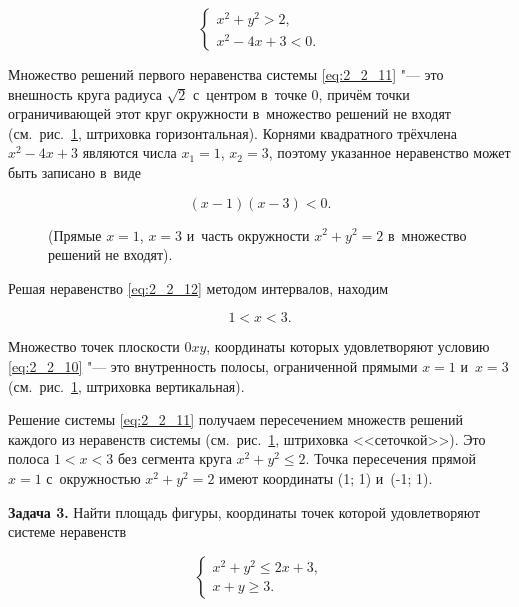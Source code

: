 \begin{equation}\label{eq:2_2_11}
\begin{cases}
x^{2} + y^{2} > 2, \\
x^{2} - 4x + 3 < 0.
\end{cases}
\end{equation}

Множество решений первого неравенства системы \eqref{eq:2_2_11}
"--- это внешность круга радиуса $\sqrt{2}$ с~центром в~точке 0,
причём точки ограничивающей этот круг окружности в~множество решений
не входят (см.\ рис.\ \ref{fig:2_2_4}, штриховка горизонтальная).
Корнями квадратного трёхчлена $x^{2} - 4x + 3$ являются числа
$x_{1} = 1$, $x_{2} = 3$, поэтому указанное неравенство
может быть записано в~виде

\begin{equation}\label{eq:2_2_12}
(x - 1)(x - 3) < 0.
\end{equation}

\begin{figure}\label{fig:2_2_4}
(Прямые $x = 1$, $x = 3$ и~часть окружности $x^{2} + y^{2} = 2$
в~множество решений не входят).
\end{figure}

\noindent
Решая неравенство \eqref{eq:2_2_12} методом интервалов, находим

\begin{equation}\label{eq:2_2_13}
1 < x < 3.
\end{equation}

\noindent
Множество точек плоскости $0xy$, координаты которых удовлетворяют условию
\eqref{eq:2_2_10} "--- это внутренность полосы, ограниченной прямыми $x = 1$
и~$x = 3$ (см.\ рис.\ \ref{fig:2_2_4}, штриховка вертикальная).

Решение системы \eqref{eq:2_2_11} получаем пересечением множеств решений
каждого из неравенств системы (см.\ рис.\ \ref{fig:2_2_4}, штриховка <<сеточкой>>).
Это полоса $1 < x < 3$ без сегмента круга $x^{2} + y^{2} \leqslant 2$.
Точка пересечения прямой $x = 1$ с~окружностью $x^{2} + y^{2} = 2$
имеют координаты (1; 1) и~(-1; 1).

\textbf{Задача 3.} \label{ex:2_2_3} Найти площадь фигуры, координаты точек
которой удовлетворяют системе неравенств

\begin{equation}\label{eq:2_2_14}
\begin{cases}
x^{2} + y^{2} \leqslant 2x + 3, \\
x + y \geqslant 3.
\end{cases}
\end{equation}

